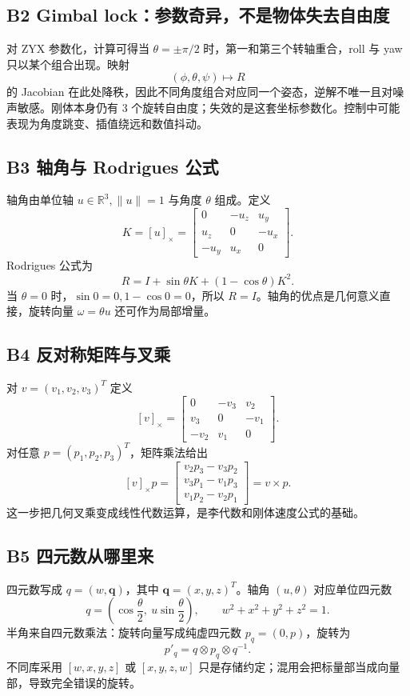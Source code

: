 \documentclass[UTF8,a4paper,11pt]{ctexart}
\newcommand{\R}{\mathbb{R}}
\newcommand{\hatmat}[1]{\left[#1\right]_{\times}}
\begin{document}
\subsection{B2 Gimbal lock：参数奇异，不是物体失去自由度}
对 ZYX 参数化，计算可得当 $\theta=\pm\pi/2$ 时，第一和第三个转轴重合，roll 与 yaw 只以某个组合出现。映射
\[
(\phi,\theta,\psi)\longmapsto R
\]
的 Jacobian 在此处降秩，因此不同角度组合对应同一个姿态，逆解不唯一且对噪声敏感。刚体本身仍有 3 个旋转自由度；失效的是这套坐标参数化。控制中可能表现为角度跳变、插值绕远和数值抖动。

\subsection{B3 轴角与 Rodrigues 公式}
轴角由单位轴 $u\in\R^3,\|u\|=1$ 与角度 $\theta$ 组成。定义
\[
K=\hatmat{u}=\begin{bmatrix}0&-u_z&u_y\\u_z&0&-u_x\\-u_y&u_x&0\end{bmatrix}.
\]
Rodrigues 公式为
\[
R=I+\sin\theta K+(1-\cos\theta)K^2.
\]
当 $\theta=0$ 时，$\sin0=0,1-\cos0=0$，所以 $R=I$。轴角的优点是几何意义直接，旋转向量 $\omega=\theta u$ 还可作为局部增量。

\subsection{B4 反对称矩阵与叉乘}
对 $v=(v_1,v_2,v_3)^T$ 定义
\[
\hatmat{v}=\begin{bmatrix}0&-v_3&v_2\\v_3&0&-v_1\\-v_2&v_1&0\end{bmatrix}.
\]
对任意 $p=(p_1,p_2,p_3)^T$，矩阵乘法给出
\[
\hatmat{v}p=\begin{bmatrix}v_2p_3-v_3p_2\\v_3p_1-v_1p_3\\v_1p_2-v_2p_1\end{bmatrix}=v\times p.
\]
这一步把几何叉乘变成线性代数运算，是李代数和刚体速度公式的基础。

\subsection{B5 四元数从哪里来}
四元数写成 $q=(w,\mathbf q)$，其中 $\mathbf q=(x,y,z)^T$。轴角 $(u,\theta)$ 对应单位四元数
\[
q=\left(\cos\frac\theta2,\ u\sin\frac\theta2\right),
\qquad w^2+x^2+y^2+z^2=1.
\]
半角来自四元数乘法：旋转向量写成纯虚四元数 $p_q=(0,p)$，旋转为
\[
p'_q=q\otimes p_q\otimes q^{-1}.
\]
不同库采用 $[w,x,y,z]$ 或 $[x,y,z,w]$ 只是存储约定；混用会把标量部当成向量部，导致完全错误的旋转。
\end{document}
